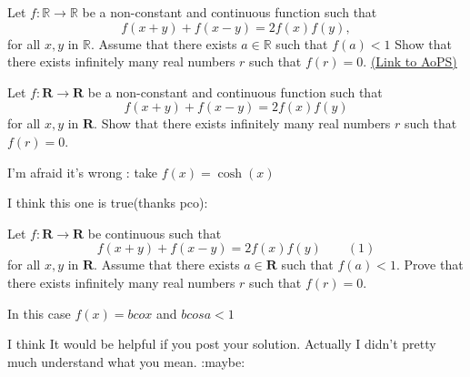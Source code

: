 \begin{problem}
	Let $ f: \mathbb R\to \mathbb R$ be a non-constant and continuous function such that \[ f(x+y)+f(x-y)=2f(x)f(y),\] for all $ x,y$ in $ \mathbb R$. Assume that there exists $ a\in\mathbb R$ such that $ f(a)<1$ Show that there exists infinitely many real numbers $ r$ such that $ f(r)=0$.
	\flushright \href{https://artofproblemsolving.com/community/c6h161693}{(Link to AoPS)}
\end{problem}



\begin{mysolution}
	\begin{tcolorbox}Let $ f: \mathbf R\to \mathbf R$ be a non-constant and continuous function such that
\[ f(x+y)+f(x-y)=2f(x)f(y) \]
for all $ x,y$ in $ \mathbf R$. Show that there exists infinitely many real numbers $ r$ such that $ f(r)=0$.\end{tcolorbox}

I'm afraid it's wrong : take $ f(x)=\cosh(x)$
\end{mysolution}



\begin{mysolution}
	I think this one is true(thanks pco):

Let $ f: \mathbf R\to \mathbf R$ be continuous such that \[ f(x+y)+f(x-y)=2f(x)f(y)\qquad(1)\]for all $ x,y$ in $ \mathbf R$. Assume that there exists $ a\in\mathbf R$ such that $ f(a)<1$. Prove that there exists infinitely many real numbers $ r$ such that $ f(r)=0$.
\end{mysolution}



\begin{mysolution}
	In this case $ f(x)=bcox$ and $ bcosa<1$
\end{mysolution}



\begin{mysolution}
	I think It would be helpful if you post your solution. Actually I didn't pretty much understand what you mean. :maybe:
\end{mysolution}



